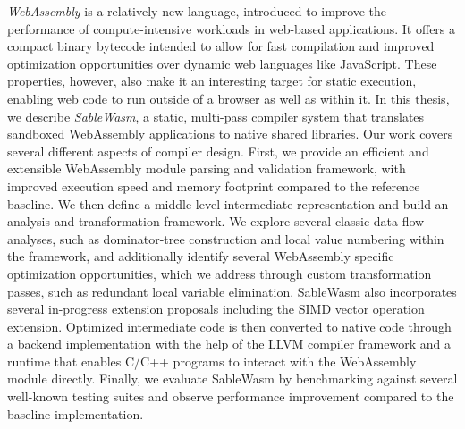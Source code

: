 \textit{WebAssembly} is a relatively new language, introduced to improve the performance of compute-intensive workloads in web-based applications.  It offers a compact binary bytecode intended to allow for fast compilation and improved optimization opportunities over dynamic web languages like JavaScript.  These properties, however, also make it an interesting target for static execution, enabling web code to run outside of a browser as well as within it.  In this thesis, we describe \textit{SableWasm}, a static, multi-pass compiler system that translates sandboxed WebAssembly applications to native shared libraries. Our work covers several different aspects of compiler design. First, we provide an efficient and extensible WebAssembly module parsing and validation framework, with improved execution speed and memory footprint compared to the reference baseline. We then define a middle-level intermediate representation and build an analysis and transformation framework. We explore several classic data-flow analyses, such as dominator-tree construction and local value numbering within the framework, and additionally identify several WebAssembly specific optimization opportunities, which we address through custom transformation passes, such as redundant local variable elimination. SableWasm also incorporates several in-progress extension proposals including the SIMD vector operation extension. Optimized intermediate code is then converted to native code through a backend implementation with the help of the LLVM compiler framework and a runtime that enables C/C++ programs to interact with the WebAssembly module directly. Finally, we evaluate SableWasm by benchmarking against several well-known testing suites and observe performance improvement compared to the baseline implementation.